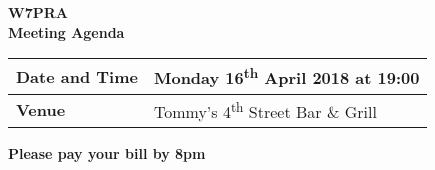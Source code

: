 \documentclass[letter,11pt]{extarticle}
\begin{document}
	\thispagestyle{empty}
	
	\begin{center}
		\textbf{W7PRA\\Meeting Agenda}
		\vspace{0.33cm}
	\end{center}
	
	\begin{center}
		\begin{tabular}{| m{3.0cm} | m{7.5cm} |} \hline
			\textbf{Date and Time} & Monday 16\textsuperscript{th} April 2018 at 19:00 \\ \hline
			\textbf{Venue} & Tommy's 4\textsuperscript{th} Street Bar \& Grill \\ \hline
				\end{tabular}
	\end{center}
	
	\begin{center}
		\textbf{Please pay your bill by 8pm}
	\end{center}
	
\end{document}
